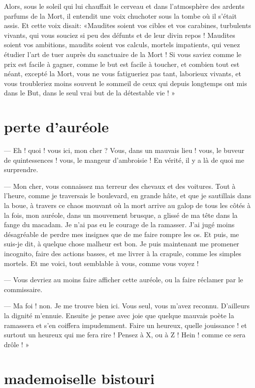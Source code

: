 Alors, sous le soleil qui lui chauffait le cerveau et dans
l’atmosphère des ardents parfums de la Mort, il
entendit une voix chuchoter sous la tombe où il
s’était assis. Et cette voix disait: «Maudites soient
vos cibles et vos carabines, turbulents vivants, qui vous souciez si
peu des défunts et de leur divin repos ! Maudites soient vos ambitions,
maudits soient vos calculs, mortels impatients, qui venez étudier
l’art de tuer auprès du sanctuaire de la Mort ! Si
vous saviez comme le prix est facile à gagner, comme le but est facile
à toucher, et combien tout est néant, excepté la Mort, vous ne vous
fatigueriez pas tant, laborieux vivants, et vous troubleriez moins
souvent le sommeil de ceux qui depuis longtemps ont mis dans le But,
dans le seul vrai but de la détestable vie ! »

\quebra\section[Perte d’auréole]{perte d’auréole}
--- Eh ! quoi ! vous ici, mon cher ? Vous, dans un mauvais lieu ! vous, le
buveur de quintessences ! vous, le mangeur d’ambroisie
! En vérité, il y a là de quoi me surprendre.

--- Mon cher, vous connaissez ma terreur des chevaux et des voitures. Tout
à l’heure, comme je traversais le boulevard, en grande
hâte, et que je sautillais dans la boue, à travers ce chaos mouvant où
la mort arrive au galop de tous les côtés à la fois, mon auréole, dans
un mouvement brusque, a glissé de ma tête dans la fange du macadam. Je
n’ai pas eu le courage de la ramasser.
J’ai jugé moins désagréable de perdre mes insignes que
de me faire rompre les os. Et puis, me suis{}-je dit, à quelque chose
malheur est bon. Je puis maintenant me promener incognito, faire des
actions basses, et me livrer à la crapule, comme les simples mortels.
Et me voici, tout semblable à vous, comme vous voyez !

--- Vous devriez au moins faire afficher cette auréole, ou la faire
réclamer par le commissaire.

--- Ma foi ! non. Je me trouve bien ici. Vous seul, vous
m’avez reconnu. D’ailleurs la dignité
m’ennuie. Ensuite je pense avec joie que quelque
mauvais poète la ramassera et s’en coiffera
impudemment. Faire un heureux, quelle jouissance ! et surtout un
heureux qui me fera rire ! Pensez à X, ou à Z ! Hein ! comme ce sera
drôle ! »

\quebra\section[Mademoiselle bistouri]{mademoiselle bistouri} 

